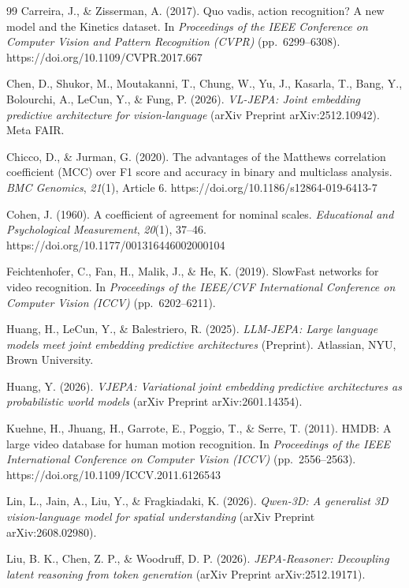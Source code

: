 \begin{thebibliography}{99}
Carreira, J., \& Zisserman, A. (2017). Quo vadis, action recognition? A new model and the Kinetics dataset. In \textit{Proceedings of the IEEE Conference on Computer Vision and Pattern Recognition (CVPR)} (pp.~6299--6308). https://doi.org/10.1109/CVPR.2017.667

Chen, D., Shukor, M., Moutakanni, T., Chung, W., Yu, J., Kasarla, T., Bang, Y., Bolourchi, A., LeCun, Y., \& Fung, P. (2026). \textit{VL-JEPA: Joint embedding predictive architecture for vision-language} (arXiv Preprint arXiv:2512.10942). Meta FAIR.

Chicco, D., \& Jurman, G. (2020). The advantages of the Matthews correlation coefficient (MCC) over F1 score and accuracy in binary and multiclass analysis. \textit{BMC Genomics}, \textit{21}(1), Article 6. https://doi.org/10.1186/s12864-019-6413-7

Cohen, J. (1960). A coefficient of agreement for nominal scales. \textit{Educational and Psychological Measurement}, \textit{20}(1), 37--46. https://doi.org/10.1177/001316446002000104

Feichtenhofer, C., Fan, H., Malik, J., \& He, K. (2019). SlowFast networks for video recognition. In \textit{Proceedings of the IEEE/CVF International Conference on Computer Vision (ICCV)} (pp.~6202--6211).

Huang, H., LeCun, Y., \& Balestriero, R. (2025). \textit{LLM-JEPA: Large language models meet joint embedding predictive architectures} (Preprint). Atlassian, NYU, Brown University.

Huang, Y. (2026). \textit{VJEPA: Variational joint embedding predictive architectures as probabilistic world models} (arXiv Preprint arXiv:2601.14354).

Kuehne, H., Jhuang, H., Garrote, E., Poggio, T., \& Serre, T. (2011). HMDB: A large video database for human motion recognition. In \textit{Proceedings of the IEEE International Conference on Computer Vision (ICCV)} (pp.~2556--2563). https://doi.org/10.1109/ICCV.2011.6126543

Lin, L., Jain, A., Liu, Y., \& Fragkiadaki, K. (2026). \textit{Qwen-3D: A generalist 3D vision-language model for spatial understanding} (arXiv Preprint arXiv:2608.02980).

Liu, B. K., Chen, Z. P., \& Woodruff, D. P. (2026). \textit{JEPA-Reasoner: Decoupling latent reasoning from token generation} (arXiv Preprint arXiv:2512.19171).


\end{thebibliography}
